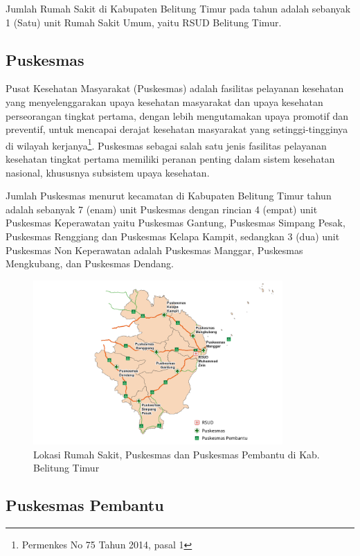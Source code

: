 Jumlah Rumah Sakit di Kabupaten Belitung Timur pada tahun \tP adalah sebanyak 1 (Satu) unit Rumah Sakit Umum, yaitu RSUD Belitung Timur.

\subsection{Puskesmas}

Pusat Kesehatan Masyarakat (Puskesmas) adalah fasilitas pelayanan kesehatan yang menyelenggarakan upaya kesehatan masyarakat dan upaya kesehatan perseorangan tingkat pertama, dengan lebih mengutamakan upaya promotif dan preventif, untuk mencapai derajat kesehatan masyarakat yang setinggi-tingginya di wilayah kerjanya\footnote{Permenkes No 75 Tahun 2014, pasal 1}. Puskesmas sebagai salah satu jenis fasilitas pelayanan kesehatan tingkat pertama memiliki peranan penting dalam sistem kesehatan nasional, khususnya subsistem upaya kesehatan.

Jumlah Puskesmas menurut kecamatan di Kabupaten Belitung Timur tahun \tP adalah sebanyak 7 (enam) unit Puskesmas dengan rincian 4 (empat) unit Puskesmas Keperawatan yaitu Puskesmas Gantung, Puskesmas Simpang Pesak, Puskesmas Renggiang dan Puskesmas Kelapa Kampit, sedangkan 3 (dua) unit Puskesmas Non Keperawatan adalah Puskesmas Manggar, Puskesmas Mengkubang, dan Puskesmas Dendang.

\begin{figure}[H]
	\centering
	\includegraphics[width=0.85\textwidth]{bab_02/bab_02_01_petaFaskes}
	\caption{Lokasi Rumah Sakit, Puskesmas dan Puskesmas Pembantu di Kab. Belitung Timur}
	\label{fig:peta-puskesmas-rs}
\end{figure}

\subsection{Puskesmas Pembantu}

